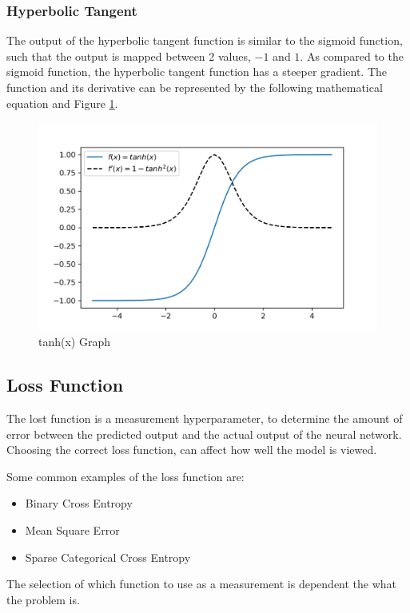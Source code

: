 \documentclass{tum-book}
\begin{document}
            \subsubsection{Hyperbolic Tangent}
            The output of the hyperbolic tangent function is similar to the sigmoid function, such that the output is mapped between 2 values, $-1$ and $1$. As compared to the sigmoid function, the hyperbolic tangent function has a steeper gradient. The function and its derivative can be represented by the following mathematical equation and Figure \ref{fig:tanh Function}.
            
                \begin{figure}[h]
                    \centering
                    \includegraphics[scale=0.75]{myFiles/myImages/tanh.png}
                    \caption{tanh(x) Graph}
                    \label{fig:tanh Function}
                \end{figure}


        \newpage\subsection{Loss Function}
        The lost function is a measurement hyperparameter, to determine the amount of error between the predicted output and the actual output of the neural network. Choosing the correct loss function, can affect how well the model is viewed. 

            \bigskip\noindent 
            Some common examples of the loss function are:
            \begin{itemize}
                \item Binary Cross Entropy
                \item Mean Square Error
                \item Sparse Categorical Cross Entropy
            \end{itemize}
            The selection of which function to use as a measurement is dependent the what the problem is. 
\end{document}
